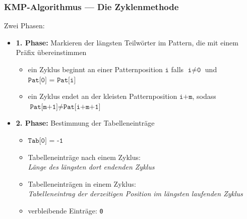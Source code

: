 \documentclass{beamer}
\begin{document}
\begin{frame} \frametitle{KMP-Algorithmus --- Die Zyklenmethode}
	Zwei Phasen:
	\pause
	\begin{itemize}
		\item \textbf{1. Phase:} Markieren der längsten Teilwörter im Pattern, die mit einem Präfix übereinstimmen
		\begin{itemize}
			\item ein Zyklus beginnt an einer Patternposition $\texttt{i}$ falls $\texttt{i} \neq \texttt{0}$ und $\texttt{Pat[0] = Pat[i]}$
			\item ein Zyklus endet an der kleisten Patternposition $\texttt{i+m}$, sodass $\texttt{Pat[m+1]} \neq \texttt{Pat[i+m+1]}$
		\end{itemize}
		\pause
		\item \textbf{2. Phase:} Bestimmung der Tabelleneinträge
		\begin{itemize}
			\item $\texttt{Tab[0] = -1}$
			\item Tabelleneinträge nach einem Zyklus: \\
			\textit{Länge des längsten dort endenden Zyklus}
			\item Tabelleneinträgen in einem Zyklus: \\
			\textit{Tabelleneintrag der derzeitigen Position im längsten laufenden Zyklus}
			\item verbleibende Einträge: \texttt{0}
		\end{itemize}
	\end{itemize}
\end{frame}
\end{document}
